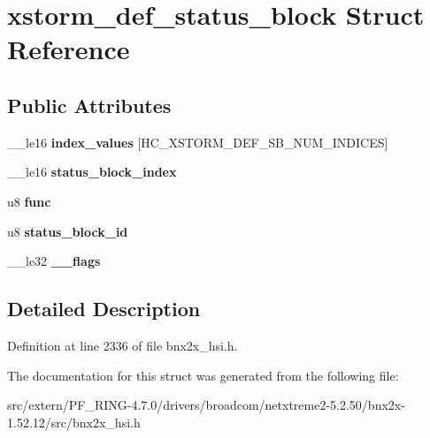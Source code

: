 \hypertarget{structxstorm__def__status__block}{
\section{xstorm\_\-def\_\-status\_\-block Struct Reference}
\label{structxstorm__def__status__block}
}
\subsection*{Public Attributes}
\begin{DoxyCompactItemize}
\item 
\hypertarget{structxstorm__def__status__block_a8fbd8c4ba1b3c9ca10f031588c8cf4fd}{
\_\-\_\-le16 {\bfseries index\_\-values} \mbox{[}HC\_\-XSTORM\_\-DEF\_\-SB\_\-NUM\_\-INDICES\mbox{]}}
\label{structxstorm__def__status__block_a8fbd8c4ba1b3c9ca10f031588c8cf4fd}

\item 
\hypertarget{structxstorm__def__status__block_a7298330713ea67ee299aa70e122da412}{
\_\-\_\-le16 {\bfseries status\_\-block\_\-index}}
\label{structxstorm__def__status__block_a7298330713ea67ee299aa70e122da412}

\item 
\hypertarget{structxstorm__def__status__block_ac272c3dbf249fe84efbf9e3acb9406a0}{
u8 {\bfseries func}}
\label{structxstorm__def__status__block_ac272c3dbf249fe84efbf9e3acb9406a0}

\item 
\hypertarget{structxstorm__def__status__block_a94516b36cef8f99ce3f0094bebbdbfc4}{
u8 {\bfseries status\_\-block\_\-id}}
\label{structxstorm__def__status__block_a94516b36cef8f99ce3f0094bebbdbfc4}

\item 
\hypertarget{structxstorm__def__status__block_a1901f7ef7ebc49c965071eb7c9a90769}{
\_\-\_\-le32 {\bfseries \_\-\_\-flags}}
\label{structxstorm__def__status__block_a1901f7ef7ebc49c965071eb7c9a90769}

\end{DoxyCompactItemize}


\subsection{Detailed Description}


Definition at line 2336 of file bnx2x\_\-hsi.h.



The documentation for this struct was generated from the following file:\begin{DoxyCompactItemize}
\item 
src/extern/PF\_\-RING-\/4.7.0/drivers/broadcom/netxtreme2-\/5.2.50/bnx2x-\/1.52.12/src/bnx2x\_\-hsi.h\end{DoxyCompactItemize}

